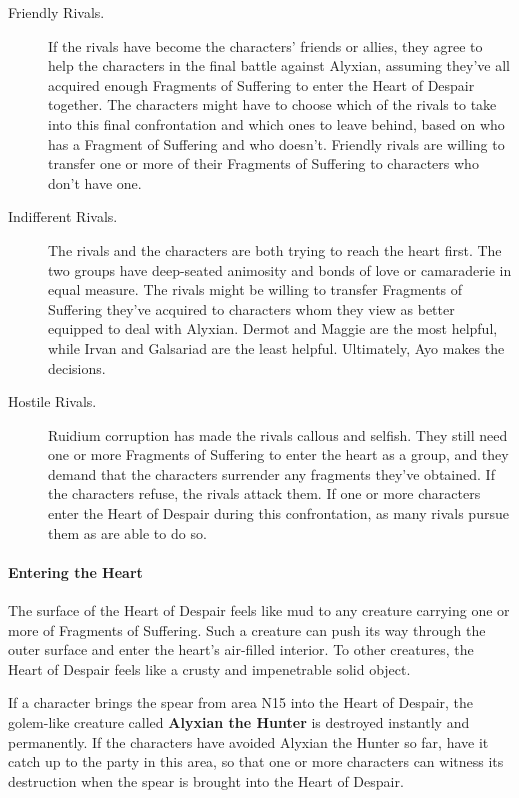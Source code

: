 \documentclass[letterpaper, 11pt, bg=full, twocolumn]{dndbook}
\begin{document}
\begin{description}
\item[Friendly Rivals.] If the rivals have become the characters' friends or allies, they agree to help the characters in the final battle against Alyxian, assuming they've all acquired enough Fragments of Suffering to enter the Heart of Despair together. The characters might have to choose which of the rivals to take into this final confrontation and which ones to leave behind, based on who has a Fragment of Suffering and who doesn't. Friendly rivals are willing to transfer one or more of their Fragments of Suffering to characters who don't have one.
\item[Indifferent Rivals.] The rivals and the characters are both trying to reach the heart first. The two groups have deep-seated animosity and bonds of love or camaraderie in equal measure. The rivals might be willing to transfer Fragments of Suffering they've acquired to characters whom they view as better equipped to deal with Alyxian. Dermot and Maggie are the most helpful, while Irvan and Galsariad are the least helpful. Ultimately, Ayo makes the decisions.
\item[Hostile Rivals.] Ruidium corruption has made the rivals callous and selfish. They still need one or more Fragments of Suffering to enter the heart as a group, and they demand that the characters surrender any fragments they've obtained. If the characters refuse, the rivals attack them. If one or more characters enter the Heart of Despair during this confrontation, as many rivals pursue them as are able to do so.
\end{description}

\paragraph{Entering the Heart}

The surface of the Heart of Despair feels like mud to any creature carrying one or more of Fragments of Suffering. Such a creature can push its way through the outer surface and enter the heart's air-filled interior. To other creatures, the Heart of Despair feels like a crusty and impenetrable solid object.

If a character brings the spear from area N15 into the Heart of Despair, the golem-like creature called \textbf{Alyxian the Hunter} is destroyed instantly and permanently. If the characters have avoided Alyxian the Hunter so far, have it catch up to the party in this area, so that one or more characters can witness its destruction when the spear is brought into the Heart of Despair.
\end{document}

